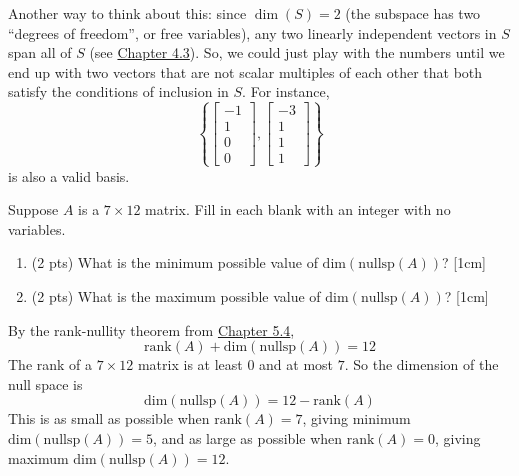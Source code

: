 \documentclass[11pt]{article}
\begin{document}
\begin{prob}
\begin{solution}
Another way to think about this: since $\dim(S)=2$ (the subspace has two ``degrees of freedom'', or free variables), any two linearly independent vectors in $S$ span all of $S$ (see \href{https://notes.eecs245.org/linear-independence/vector-spaces-basis-dimension/}{Chapter 4.3}). So, we could just play with the numbers until we end up with two vectors that are not scalar multiples of each other that both satisfy the conditions of inclusion in $S$. For instance, $$\left\{\begin{bmatrix}-1\\1\\0\\0\end{bmatrix},\begin{bmatrix}-3 \\ 1 \\ 1 \\ 1\end{bmatrix}\right\}$$ is also a valid basis.
\end{solution}
\end{prob}

\begin{prob}
Suppose $A$ is a $7 \times 12$ matrix. Fill in each blank with an integer with no variables.

\begin{enumerate}[label=(\roman*)]
    \item (2 pts) What is the minimum possible value of $\text{dim}(\text{nullsp}(A))$? [1cm]
    \item (2 pts) What is the maximum possible value of $\text{dim}(\text{nullsp}(A))$? [1cm]
\end{enumerate}

\begin{solution}
By the rank-nullity theorem from \href{https://notes.eecs245.org/matrices/null-space-rank-nullity/}{Chapter 5.4},
\[
\text{rank}(A)+\text{dim}(\text{nullsp}(A))=12
\]
The rank of a $7\times 12$ matrix is at least $0$ and at most $7$. So the dimension of the null space is
\[
\text{dim}(\text{nullsp}(A))=12-\text{rank}(A)
\]
This is as small as possible when $\text{rank}(A)=7$, giving minimum $\text{dim}(\text{nullsp}(A)) = 5$, and as large as possible when $\text{rank}(A)=0$, giving maximum $\text{dim}(\text{nullsp}(A)) = 12$.
\end{solution}
\end{prob}
\end{document}
